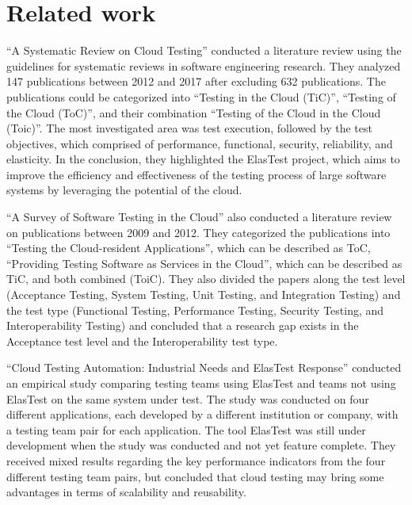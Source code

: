 \documentclass[conference]{IEEEtran}
\begin{document}
\section{Related work}

\enquote{A Systematic Review on Cloud Testing} conducted a literature review using the guidelines for systematic reviews in software engineering research\cite{bertolino2019systematic}.
They analyzed 147 publications between 2012 and 2017 after excluding 632 publications\cite{bertolino2019systematic}.
The publications could be categorized into \enquote{Testing in the Cloud (TiC)}, \enquote{Testing of the Cloud (ToC)}, and their combination \enquote{Testing of the Cloud in the Cloud (Toic)}\cite{bertolino2019systematic}.
The most investigated area was test execution, followed by the test objectives, which comprised of performance, functional, security, reliability, and elasticity\cite{bertolino2019systematic}.
In the conclusion, they highlighted the ElasTest project, which aims to improve the efficiency and effectiveness of the testing process of large software systems by leveraging the potential of the cloud\cite{bertolino2019systematic, bertolino2020cloud}.

\enquote{A Survey of Software Testing in the Cloud} also conducted a literature review on publications between 2009 and 2012.
They categorized the publications into \enquote{Testing the Cloud-resident Applications}, which can be described as ToC,
\enquote{Providing Testing Software as Services in the Cloud}, which can be described as TiC, and both combined (ToiC).
They also divided the papers along the test level (Acceptance Testing, System Testing, Unit Testing, and Integration Testing)
and the test type (Functional Testing, Performance Testing, Security Testing, and Interoperability Testing) and concluded that a research gap exists in the Acceptance test level and the Interoperability test type\cite{6258440}.

\enquote{Cloud Testing Automation: Industrial Needs and ElasTest Response} conducted an empirical study comparing
testing teams using ElasTest and teams not using ElasTest on the same system under test.
The study was conducted on four different applications, each developed by a different institution or company,
with a testing team pair for each application.
The tool ElasTest was still under development when the study was conducted and not yet feature complete.
They received mixed results regarding the key performance indicators from the four different testing team pairs, but
concluded that cloud testing may bring some advantages in terms of scalability and reusability\cite{bertolino2020cloud}.
\end{document}
